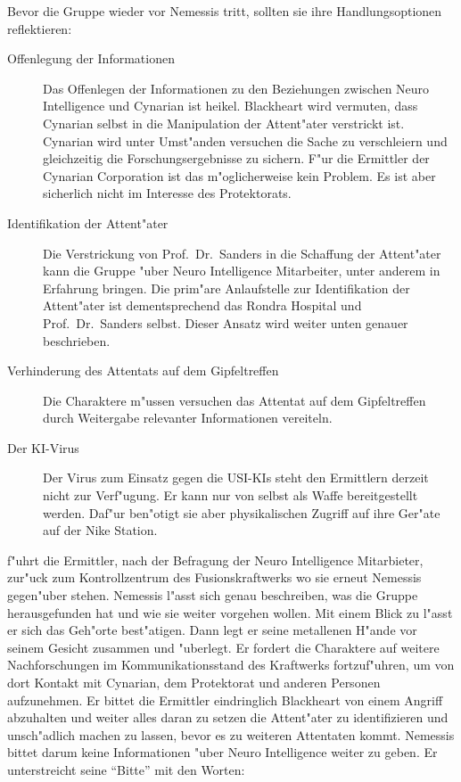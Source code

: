 
Bevor die Gruppe wieder vor Nemessis tritt, sollten sie ihre Handlungsoptionen reflektieren:

\begin{description}
	\item[Offenlegung der Informationen] Das Offenlegen der Informationen zu den Beziehungen zwischen Neuro Intelligence und Cynarian 	
		ist heikel. Blackheart wird vermuten, dass Cynarian selbst in die Manipulation der Attent"ater verstrickt ist. Cynarian wird unter Umst"anden versuchen die Sache zu verschleiern und gleichzeitig die Forschungsergebnisse zu 	sichern. F"ur die Ermittler der Cynarian Corporation ist das m"oglicherweise kein Problem. Es ist aber sicherlich nicht im Interesse des Protektorats.
	\item[Identifikation der Attent"ater] Die Verstrickung von Prof.~Dr.~Sanders in die Schaffung der Attent"ater kann die Gruppe "uber 	
		Neuro Intelligence Mitarbeiter, unter anderem \ml{} in Erfahrung bringen. Die prim"are Anlaufstelle zur Identifikation der Attent"ater ist dementsprechend das Rondra Hospital und Prof.~Dr.~Sanders selbst. Dieser Ansatz wird weiter unten genauer beschrieben.
	\item[Verhinderung des Attentats auf dem Gipfeltreffen] Die Charaktere m"ussen versuchen das Attentat auf dem Gipfeltreffen durch 
		Weitergabe relevanter Informationen vereiteln.
	\item[Der KI-Virus] Der Virus zum Einsatz gegen die USI-KIs steht den Ermittlern derzeit nicht zur Verf"ugung. Er kann nur von \ml{}
		selbst als Waffe bereitgestellt werden. Daf"ur ben"otigt sie aber physikalischen Zugriff auf ihre Ger"ate auf der Nike Station.
\end{description}

\xl{} f"uhrt die Ermittler, nach der Befragung der Neuro Intelligence Mitarbieter, zur"uck zum Kontrollzentrum des Fusionskraftwerks wo sie erneut Nemessis gegen"uber stehen. Nemessis l"asst sich genau beschreiben, was die Gruppe herausgefunden hat und wie sie weiter vorgehen wollen. Mit einem Blick zu \xl{} l"asst er sich das Geh"orte best"atigen. Dann legt er seine metallenen H"ande vor seinem Gesicht zusammen und "uberlegt. Er fordert die Charaktere auf weitere Nachforschungen im Kommunikationsstand des Kraftwerks fortzuf"uhren, um von dort Kontakt mit Cynarian, dem Protektorat und anderen Personen aufzunehmen. Er bittet die Ermittler eindringlich Blackheart von einem Angriff abzuhalten und weiter alles daran zu setzen die Attent"ater zu identifizieren und unsch"adlich machen zu lassen, bevor es zu weiteren Attentaten kommt. Nemessis bittet darum keine Informationen "uber  Neuro Intelligence weiter zu geben. Er unterstreicht seine "`Bitte"' mit den Worten:


